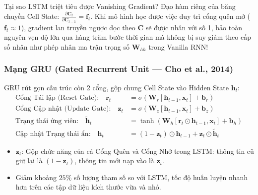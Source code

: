 \documentclass[10pt,a4paper]{article}
\begin{document}
\begin{trapbox}{Tại sao LSTM triệt tiêu được Vanishing Gradient?}
Đạo hàm riêng của băng chuyền Cell State: $\frac{\partial \mathbf{C}_t}{\partial \mathbf{C}_{t-1}} = \mathbf{f}_t$. Khi mô hình học được việc duy trì cổng quên mở ($\mathbf{f}_t \approx 1$), gradient lan truyền ngược dọc theo $\mathbf{C}$ sẽ được nhân với số 1, bảo toàn nguyên vẹn độ lớn qua hàng trăm bước thời gian mà không bị suy giảm theo cấp số nhân như phép nhân ma trận trọng số $\mathbf{W}_{hh}$ trong Vanilla RNN!
\end{trapbox}

\subsubsection{Mạng GRU (Gated Recurrent Unit --- Cho et al., 2014)}
GRU rút gọn cấu trúc còn 2 cổng, gộp chung Cell State vào Hidden State $\mathbf{h}_t$:
\begin{align}
    \text{Cổng Tái lập (Reset Gate):} \quad \mathbf{r}_t &= \sigma(\mathbf{W}_r [\mathbf{h}_{t-1}, \mathbf{x}_t] + \mathbf{b}_r) \\
    \text{Cổng Cập nhật (Update Gate):} \quad \mathbf{z}_t &= \sigma(\mathbf{W}_z [\mathbf{h}_{t-1}, \mathbf{x}_t] + \mathbf{b}_z) \\
    \text{Trạng thái ứng viên:} \quad \tilde{\mathbf{h}}_t &= \tanh(\mathbf{W}_h [\mathbf{r}_t \odot \mathbf{h}_{t-1}, \mathbf{x}_t] + \mathbf{b}_h) \\
    \text{Cập nhật Trạng thái ẩn:} \quad \mathbf{h}_t &= (1 - \mathbf{z}_t) \odot \mathbf{h}_{t-1} + \mathbf{z}_t \odot \tilde{\mathbf{h}}_t
\end{align}
\begin{itemize}[leftmargin=*]
    \item $\mathbf{z}_t$: Gộp chức năng của cả Cổng Quên và Cổng Nhớ trong LSTM: thông tin cũ giữ lại là $(1 - \mathbf{z}_t)$, thông tin mới nạp vào là $\mathbf{z}_t$.
    \item Giảm khoảng $25\%$ số lượng tham số so với LSTM, tốc độ huấn luyện nhanh hơn trên các tập dữ liệu kích thước vừa và nhỏ.
\end{itemize}
\end{document}
